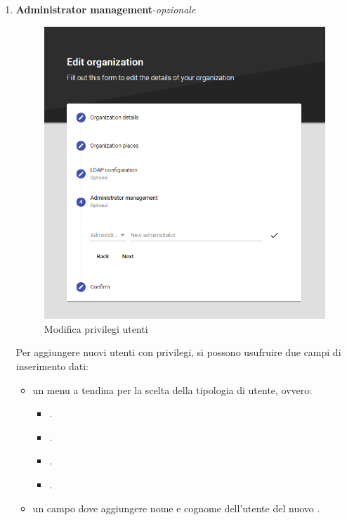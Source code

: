 \documentclass[../manuale-utente.tex]{subfiles}
\begin{document}
\begin{enumerate}
    \newpage
    \item \textbf{Administrator management}-\textit{opzionale}
    
    \begin{figure}[H]
        \centering
        \includegraphics[width=120mm]{img/web-app/edit-organization/4-privilegi.png}
        \caption{Modifica privilegi utenti}%
        \label{fig:web_app_modifica_privilegi_utenti}
    \end{figure}

    Per aggiungere nuovi utenti con privilegi, si possono usufruire due campi di inserimento dati:
    \begin{itemize}
        \item un menu a tendina per la scelta della tipologia di utente, ovvero:
        \begin{itemize}
            \item {}.
            \item {}.
            \item {}.
            \item {}.
        \end{itemize}
        \item un campo dove aggiungere nome e cognome dell'utente del nuovo .
    \end{itemize}


\end{enumerate}
\end{document}
